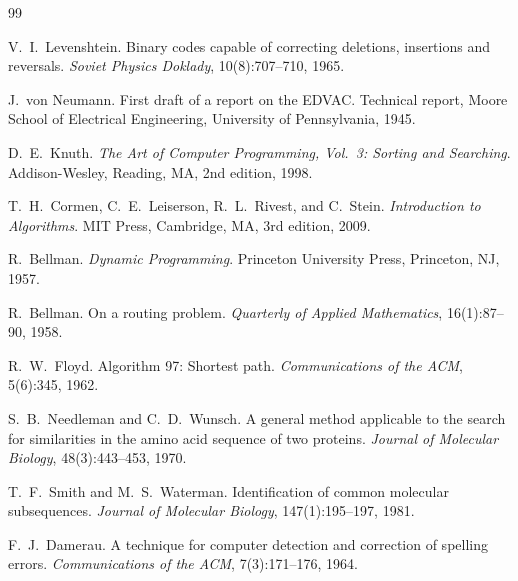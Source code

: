 ﻿\documentclass[a4paper,12pt]{article}
\theoremstyle{definition}
\begin{document}
\begin{thebibliography}{99}

V.\ I.\ Levenshtein.
\newblock Binary codes capable of correcting deletions, insertions and reversals.
\newblock \textit{Soviet Physics Doklady}, 10(8):707--710, 1965.

J.\ von Neumann.
\newblock First draft of a report on the EDVAC.
\newblock Technical report, Moore School of Electrical Engineering,
         University of Pennsylvania, 1945.

D.\ E.\ Knuth.
\newblock \textit{The Art of Computer Programming, Vol.\ 3: Sorting and Searching}.
\newblock Addison-Wesley, Reading, MA, 2nd edition, 1998.

T.\ H.\ Cormen, C.\ E.\ Leiserson, R.\ L.\ Rivest, and C.\ Stein.
\newblock \textit{Introduction to Algorithms}.
\newblock MIT Press, Cambridge, MA, 3rd edition, 2009.

R.\ Bellman.
\newblock \textit{Dynamic Programming}.
\newblock Princeton University Press, Princeton, NJ, 1957.

R.\ Bellman.
\newblock On a routing problem.
\newblock \textit{Quarterly of Applied Mathematics}, 16(1):87--90, 1958.

R.\ W.\ Floyd.
\newblock Algorithm 97: Shortest path.
\newblock \textit{Communications of the ACM}, 5(6):345, 1962.

S.\ B.\ Needleman and C.\ D.\ Wunsch.
\newblock A general method applicable to the search for similarities in the
         amino acid sequence of two proteins.
\newblock \textit{Journal of Molecular Biology}, 48(3):443--453, 1970.

T.\ F.\ Smith and M.\ S.\ Waterman.
\newblock Identification of common molecular subsequences.
\newblock \textit{Journal of Molecular Biology}, 147(1):195--197, 1981.

F.\ J.\ Damerau.
\newblock A technique for computer detection and correction of spelling errors.
\newblock \textit{Communications of the ACM}, 7(3):171--176, 1964.


\end{thebibliography}
\end{document}
